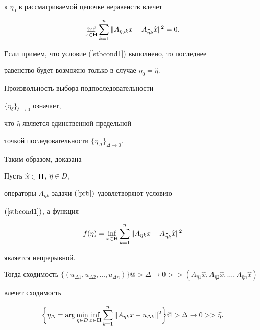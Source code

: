 к $\eta_0$ в рассматриваемой цепочке неравенств влечет


$$


\inf_{x\in {\bold H}}\sum_{k=1}^n\| A_{\eta_0k}x-A_{\widehat \eta


k}\widehat x\|^2=0. 


$$


Если примем, что условие (\ref{stbcond1}) выполнено, то последнее


равенство будет возможно только в случае $\eta_0=\widehat \eta $.


Произвольность выбора подпоследовательности


$\{\eta_\delta \}_{\delta \to 0}$ означает,


что $\widehat \eta $ является единственной предельной


точкой последовательности $\{\eta_\Delta \}_{\Delta \to 0}.$





Таким образом, доказана 





\begin{thm}


\label{th3}


Пусть $\widehat x\in {\bold H}$, $\widehat \eta \in D$,


операторы $A_{\eta k}$ задачи $(\ref{prb})$ удовлетворяют условию


$(\ref{stbcond1})$, а функция


$$


f(\eta )=\inf_{x\in {\bold H}}\sum_{k=1}^n\| A_{\eta


k}x-A_{\widehat \eta k}\widehat x\|^2


$$


является непрерывной.





Тогда сходимость $\{ (u_{\Delta 1},u_{\Delta 2},\dotsc, u_{\Delta


n})\}@>{\Delta \to 0}>> ( A_{\widehat 


\eta 1}\widehat x,A_{\widehat \eta 2}\widehat x,\dotsc,


A_{\widehat \eta n}\widehat x) $


влечет сходимость 


$$


\bigg\{ \eta_\Delta =\arg \min_{\eta \in D}\inf_{x\in {\bold H}%


}\sum_{k=1}^n\| A_{\eta k}x-u_{\Delta k}\|^2\bigg\}


@>{\Delta \to 0}>> \widehat \eta.


$$


\end{thm}





